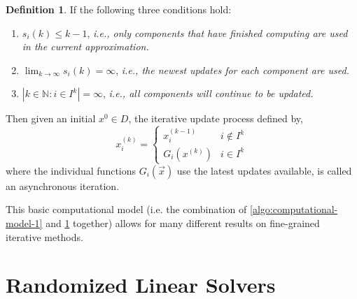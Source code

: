\documentclass{article}
\theoremstyle{definition}
\newtheorem{definition}{Definition}
\theoremstyle{example}
\theoremstyle{example}
\theoremstyle{example}
\begin{document}
\begin{definition}
	\label{def:asynchronous-model}
	If the following three conditions hold:
	\begin{enumerate}
		\item	$s_i(k) \leq k - 1$, {\em i.e., only components that have finished computing are used in the current approximation.}
		\item	$\lim_{k\rightarrow \infty} s_i(k) = \infty$, {\em i.e., the newest updates for each component are used.}
		\item	$|{k \in \mathbb{N}: i \in I^k}| = \infty$, {\em i.e., all components will continue to be updated.}
	\end{enumerate}
	Then given an initial $x^0 \in D$, the iterative update process defined by,
	\[ x_i^{(k)} =
	\begin{cases}
	x_i^{(k-1)} 		& 	i \notin I^k \\
	G_i(x^{(k)}) 		&	i \in    I^k
	\end{cases}
	\]
	where the individual functions $G_i(\vec{x})$ use the latest updates available, is called an asynchronous iteration.
\end{definition}

This basic computational model (i.e. the combination of \cref{algo:computational-model-1} and \cref{def:asynchronous-model} together) allows for many different results on fine-grained iterative methods.


%
\section{Randomized Linear Solvers}
\label{sect:randomized-linear-solvers}
\end{document}
